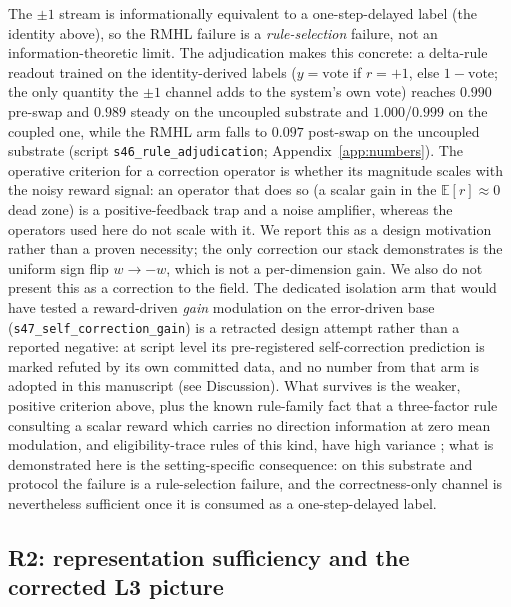 \documentclass[preprint,12pt]{elsarticle}
\begin{document}
The $\pm1$ stream is informationally equivalent to a one-step-delayed label
(the identity above), so the RMHL failure is a
\emph{rule-selection} failure, not an information-theoretic limit.
The adjudication makes this concrete: a delta-rule readout trained on the
identity-derived labels ($y=\mathrm{vote}$ if $r=+1$, else $1-\mathrm{vote}$;
the only quantity the $\pm1$ channel adds to the system's own vote) reaches
$0.990$ pre-swap and $0.989$ steady on the uncoupled substrate and
$1.000$/$0.999$ on the coupled one, while the RMHL arm falls to $0.097$
post-swap on the uncoupled substrate (script \texttt{s46\_rule\_adjudication};
Appendix~\ref{app:numbers}). The
operative criterion for a correction operator is whether its magnitude
scales with the noisy reward signal: an operator that does so (a scalar gain
in the $\mathbb E[r]\approx0$ dead zone) is a positive-feedback trap and a
noise amplifier, whereas the operators used here do not scale with it. We
report this as a design motivation rather than a proven necessity; the
only correction our stack demonstrates is the uniform sign flip $w\to-w$,
which is not a per-dimension gain. We also do not present this as a correction
to the field. The dedicated isolation arm that would have tested a
reward-driven \emph{gain} modulation on the error-driven base
(\texttt{s47\_self\_correction\_gain}) is a retracted design attempt rather
than a reported negative: at script level its pre-registered self-correction
prediction is marked refuted by its own committed data, and no number from
that arm is adopted in this manuscript (see Discussion). What survives is
the weaker, positive criterion above, plus the known rule-family fact that a
three-factor rule consulting a scalar reward which carries no direction
information at zero mean modulation, and eligibility-trace rules of this
kind, have high variance
\cite{pfister2006,hoerzer2014}; what is demonstrated here is
the setting-specific consequence: on this substrate and protocol the
failure is a rule-selection failure, and the correctness-only channel is
nevertheless sufficient once it is consumed as a one-step-delayed label.

\subsection{R2: representation sufficiency and the corrected L3 picture}
\label{sec:r2}
\end{document}
